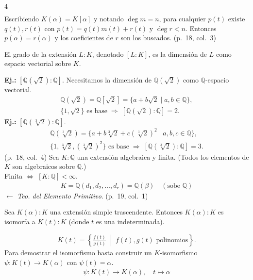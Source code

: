 \documentclass[landscape,a4paper]{article}
\begin{document}
\begin{multicols}{4}
\begin{align*}
\end{align*}
Escribiendo $K(\alpha)=K[\alpha]$ y notando $\deg m=n$, para cualquier $p(t)$ existe $q(t),r(t)$ con $p(t)=q(t)m(t)+r(t)$ y $\deg r<n$. Entonces $p(\alpha)=r(\alpha)$ y los coeficientes de $r$ son los buscados. (p.~18, col.~3)
\begin{tcolorbox}[colback=white,colframe=blue!80!black,colbacktitle=blue!80!black,coltitle=white,title={Definición: Grado de una extensión (p.~18, col.~4)}]
El grado de la extensión $L:K$, denotado $[L:K]$, es la dimensión de $L$ como espacio vectorial sobre $K$.
\end{tcolorbox}
\textbf{Ej.:} $[\mathbb{Q}(\sqrt{2}):\mathbb{Q}]$. Necesitamos la dimensión de $\mathbb{Q}(\sqrt{2})$ como $\mathbb{Q}$-espacio vectorial.
\begin{align*}
\mathbb{Q}(\sqrt{2}) = \mathbb{Q}[\sqrt{2}] = \{a+b\sqrt{2}\mid a,b\in\mathbb{Q}\},\\
\{1,\sqrt{2}\}\text{ es base}\;\Rightarrow\;[\mathbb{Q}(\sqrt{2}):\mathbb{Q}] = 2.
\end{align*}
\textbf{Ej.:} $[\mathbb{Q}(\sqrt[3]{2}):\mathbb{Q}]$.
\begin{align*}
\mathbb{Q}(\sqrt[3]{2}) = \{a + b\sqrt[3]{2} + c (\sqrt[3]{2})^{2}\mid a,b,c\in\mathbb{Q}\},\\
\{1,\sqrt[3]{2},(\sqrt[3]{2})^{2}\}\text{ es base}\;\Rightarrow\;[\mathbb{Q}(\sqrt[3]{2}):\mathbb{Q}] = 3.
\end{align*}
(p.~18, col.~4)
Sea $K:\mathbb{Q}$ una extensión algebraica y finita. (Todos los elementos de $K$ son algebraicos sobre $\mathbb{Q}$.)\\
Finita $\Leftrightarrow$ $[K:\mathbb{Q}]<\infty$.\\
\begin{align*}
K = \mathbb{Q}(d_1,d_2,\dots,d_r) = \mathbb{Q}(\beta)\quad(\text{sobe } \mathbb{Q})
\end{align*}
\hfill$\leftarrow$ \textit{Teo. del Elemento Primitivo}. (p.~19, col.~1)
\begin{tcolorbox}[colback=white,colframe=red!80!black,colbacktitle=red!80!black,coltitle=white,title={Teorema: Extensiones simples trascendentes (p.~19, col.~2)}]
Sea $K(\alpha):K$ una extensión simple trascendente. Entonces $K(\alpha):K$ es isomorfa a $K(t):K$ (donde $t$ es una indeterminada).
\end{tcolorbox}
\begin{align*}
K(t)=\left\{\frac{f(t)}{g(t)}\;\middle|\;f(t),g(t)\text{ polinomios}\right\}.
\end{align*}
Para demostrar el isomorfismo basta construir un $K$-isomorfismo $\psi:K(t)\to K(\alpha)$ con $\psi(t)=\alpha$.
\begin{align*}
\psi:K(t)\longrightarrow K(\alpha),\quad t\mapsto \alpha
\end{align*}

\end{multicols}
\end{document}
